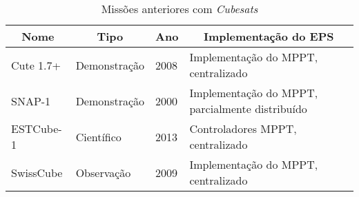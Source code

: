 \begin{table}
\centering
\caption{Missões anteriores com \textit{Cubesats}}
\label{history_table}
\begin{tabular}{|l|l|l|l|} 
\hline
\multicolumn{1}{|c|}{Nome} & \multicolumn{1}{c|}{Tipo} & \multicolumn{1}{c|}{Ano} & \multicolumn{1}{c|}{Implementação do EPS}  \\ 
\hline
Cute 1.7+                  & Demonstração              & 2008                     &  Implementação do MPPT, centralizado  \\ 
\hline
SNAP-1                     & Demonstração              & 2000                     &  Implementação do MPPT, parcialmente distribuído  \\
\hline
ESTCube-1                  & Científico                & 2013                     &  Controladores MPPT, centralizado     \\ 
\hline
SwissCube                  & Observação                & 2009                     &  Implementação do MPPT, centralizado  \\
\hline
\end{tabular}
\end{table}